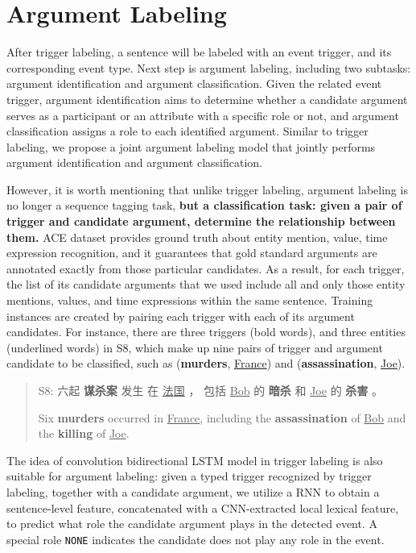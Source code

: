 \section{Argument Labeling}\label{argument}
After trigger labeling, a sentence will be labeled with an event trigger, and its corresponding event type. Next step is argument labeling, including two subtasks: argument identification and argument classification. Given the related event trigger, argument identification aims to determine whether a candidate argument serves as a participant or an attribute with a specific role or not, and argument classification assigns a role to each identified argument. Similar to trigger labeling, we propose a joint argument labeling model that jointly performs argument identification and argument classification.

However, it is worth mentioning that unlike trigger labeling, argument labeling is no longer a sequence tagging task, \textbf{but a  classification task: given a pair of trigger and candidate argument, determine the relationship between them.} ACE dataset provides ground truth about entity mention, value, time expression recognition, and it guarantees that gold standard arguments are annotated exactly from those particular candidates. As a result, for each trigger, the list of its candidate arguments that we used include all and only those entity mentions, values, and time expressions within the same sentence. Training instances are created by pairing each trigger with each of its argument candidates. For instance, there are three triggers (bold words), and three entities (underlined words) in S8, which make up nine pairs of trigger and argument candidate to be classified, such as (\textbf{murders}, \underline{France}) and (\textbf{assassination}, \underline{Joe}).

\begin{quote}
	S8: 六起 \textbf{谋杀案} 发生 在 \underline{法国} ， 包括 \underline{Bob} 的 \textbf{暗杀} 和 \underline{Joe} 的 \textbf{杀害} 。
	
	\hspace{0.55cm} Six \textbf{murders} occurred in \underline{France}, including the \textbf{assassination} of \underline{Bob} and the \textbf{killing} of \underline{Joe}.
\end{quote}
The idea of convolution bidirectional LSTM model in trigger labeling is also suitable for argument labeling: given a typed trigger recognized by trigger labeling, together with a candidate argument, we utilize a RNN to obtain a sentence-level feature, concatenated with a CNN-extracted local lexical feature, to predict what role the candidate argument plays in the detected event. A special role \texttt{NONE} indicates the candidate does not play any role in the event.

